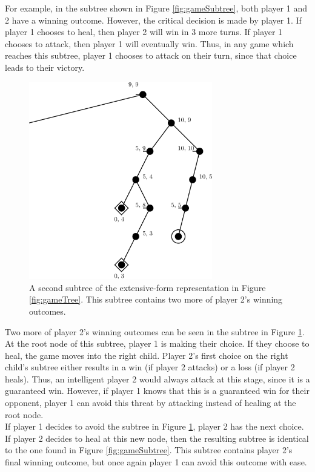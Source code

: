 For example, in the subtree shown in Figure \ref{fig:gameSubtree}, both player 1 and 2 have a winning outcome. However, the critical decision is made by player 1. If player 1 chooses to heal, then player 2 will win in 3 more turns. If player 1 chooses to attack, then player 1 will eventually win. Thus, in any game which reaches this subtree, player 1 chooses to attack on their turn, since that choice leads to their victory.\\

\begin{figure}[H]
  \centering
  \includegraphics[width=8cm]{figures/GameSubtree2.png}
  \caption{A second subtree of the extensive-form representation in Figure \ref{fig:gameTree}. This subtree contains two more of player 2's winning outcomes.}
  \label{fig:gameSubtree2}
\end{figure}

Two more of player 2's winning outcomes can be seen in the subtree in Figure \ref{fig:gameSubtree2}. At the root node of this subtree, player 1 is making their choice. If they choose to heal, the game moves into the right child. Player 2's first choice on the right child's subtree either results in a win (if player 2 attacks) or a loss (if player 2 heals). Thus, an intelligent player 2 would always attack at this stage, since it is a guaranteed win. However, if player 1 knows that this is a guaranteed win for their opponent, player 1 can avoid this threat by attacking instead of healing at the root node.\\

If player 1 decides to avoid the subtree in Figure \ref{fig:gameSubtree2}, player 2 has the next choice. If player 2 decides to heal at this new node, then the resulting subtree is identical to the one found in Figure \ref{fig:gameSubtree}. This subtree contains player 2's final winning outcome, but once again player 1 can avoid this outcome with ease.\\

